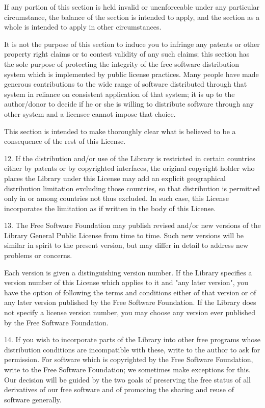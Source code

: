 \documentclass[a4paper,twoside]{tceusermanual}
\begin{document}
If any portion of this section is held invalid or unenforceable
under any particular circumstance, the balance of the section is
intended to apply, and the section as a whole is intended to
apply in other circumstances.

It is not the purpose of this section to induce you to infringe
any patents or other property right claims or to contest
validity of any such claims; this section has the sole purpose
of protecting the integrity of the free software distribution
system which is implemented by public license practices.  Many
people have made generous contributions to the wide range of
software distributed through that system in reliance on
consistent application of that system; it is up to the
author/donor to decide if he or she is willing to distribute
software through any other system and a licensee cannot impose
that choice.

This section is intended to make thoroughly clear what is
believed to be a consequence of the rest of this License.

12. If the distribution and/or use of the Library is restricted
in certain countries either by patents or by copyrighted
interfaces, the original copyright holder who places the Library
under this License may add an explicit geographical distribution
limitation excluding those countries, so that distribution is
permitted only in or among countries not thus excluded.  In such
case, this License incorporates the limitation as if written in
the body of this License.

13. The Free Software Foundation may publish revised and/or new
versions of the Library General Public License from time to
time. Such new versions will be similar in spirit to the present
version, but may differ in detail to address new problems or
concerns.

Each version is given a distinguishing version number.  If the
Library specifies a version number of this License which applies
to it and "any later version", you have the option of following
the terms and conditions either of that version or of any later
version published by the Free Software Foundation.  If the
Library does not specify a license version number, you may
choose any version ever published by the Free Software
Foundation.

14. If you wish to incorporate parts of the Library into other
free programs whose distribution conditions are incompatible
with these, write to the author to ask for permission.  For
software which is copyrighted by the Free Software Foundation,
write to the Free Software Foundation; we sometimes make
exceptions for this.  Our decision will be guided by the two
goals of preserving the free status of all derivatives of our
free software and of promoting the sharing and reuse of software
generally.
\end{document}
